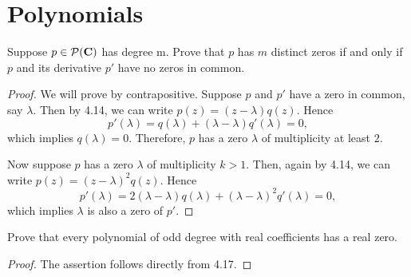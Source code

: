 \chapter{Polynomials}

\begin{exercise}{6}
	Suppose \( p \in \operatorname{\mathcal{P}}(\mathbf{C}) \) has degree m. Prove that \( p \) has \( m \) distinct zeros if
and only if \( p \) and its derivative \( p' \) have no zeros in common.
\end{exercise}

\begin{proof}
	We will prove by contrapositive. Suppose \( p \) and \( p' \) have a zero in common, say \( \lambda \). Then by 4.14, we can write \( p(z) = (z - \lambda)q(z) \). Hence
	\[
		p'(\lambda) = q(\lambda) + (\lambda - \lambda)q'(\lambda) = 0,
	\]
	which implies \( q(\lambda) = 0 \). Therefore, \( p \) has a zero \( \lambda \) of multiplicity at least \( 2 \).

	Now suppose \( p \) has a zero \( \lambda \) of multiplicity \( k > 1 \). Then, again by 4.14, we can write \( p(z) = (z - \lambda)^2q(z) \). Hence
	\[
		p'(\lambda) = 2(\lambda - \lambda)q(\lambda) + (\lambda - \lambda)^2q'(\lambda) = 0,
	\]
	which implies \( \lambda \) is also a zero of \( p' \).
\end{proof}

\begin{exercise}{7}
	Prove that every polynomial of odd degree with real coefficients has a real zero.
\end{exercise}

\begin{proof}
	The assertion follows directly from 4.17.
\end{proof}
